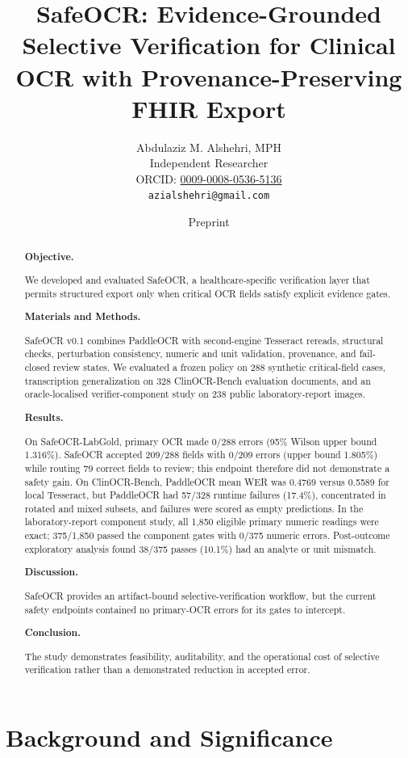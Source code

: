 \documentclass[10pt]{article}
\title{SafeOCR: Evidence-Grounded Selective Verification for Clinical OCR with Provenance-Preserving FHIR Export}
\author{Abdulaziz M. Alshehri, MPH\\Independent Researcher\\ORCID: \href{https://orcid.org/0009-0008-0536-5136}{0009-0008-0536-5136}\\\texttt{azialshehri@gmail.com}}
\date{Preprint}
\begin{document}
\maketitle
\begin{abstract}

\textbf{Objective.}

We developed and evaluated SafeOCR, a healthcare-specific verification layer that permits structured export only when critical OCR fields satisfy explicit evidence gates.

\textbf{Materials and Methods.}

SafeOCR v0.1 combines PaddleOCR with second-engine Tesseract rereads, structural checks, perturbation consistency, numeric and unit validation, provenance, and fail-closed review states. We evaluated a frozen policy on 288 synthetic critical-field cases, transcription generalization on 328 ClinOCR-Bench evaluation documents, and an oracle-localised verifier-component study on 238 public laboratory-report images.

\textbf{Results.}

On SafeOCR-LabGold, primary OCR made 0/288 errors (95\% Wilson upper bound 1.316\%). SafeOCR accepted 209/288 fields with 0/209 errors (upper bound 1.805\%) while routing 79 correct fields to review; this endpoint therefore did not demonstrate a safety gain. On ClinOCR-Bench, PaddleOCR mean WER was 0.4769 versus 0.5589 for local Tesseract, but PaddleOCR had 57/328 runtime failures (17.4\%), concentrated in rotated and mixed subsets, and failures were scored as empty predictions. In the laboratory-report component study, all 1,850 eligible primary numeric readings were exact; 375/1,850 passed the component gates with 0/375 numeric errors. Post-outcome exploratory analysis found 38/375 passes (10.1\%) had an analyte or unit mismatch.

\textbf{Discussion.}

SafeOCR provides an artifact-bound selective-verification workflow, but the current safety endpoints contained no primary-OCR errors for its gates to intercept.

\textbf{Conclusion.}

The study demonstrates feasibility, auditability, and the operational cost of selective verification rather than a demonstrated reduction in accepted error.

\end{abstract}
\section{Background and Significance}
\end{document}
